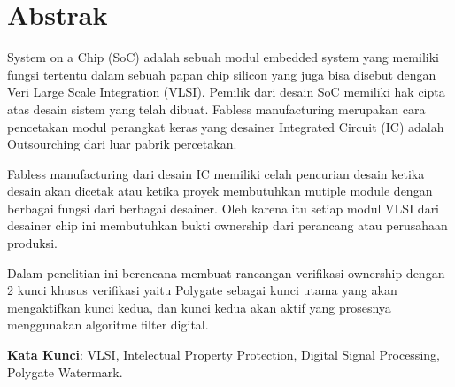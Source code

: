 \chapter*{Abstrak}

\noindent System on a Chip (SoC) adalah sebuah modul embedded system yang
memiliki fungsi tertentu dalam sebuah papan chip silicon yang juga bisa disebut
dengan Veri Large Scale Integration (VLSI). Pemilik dari desain SoC memiliki
hak cipta atas desain sistem yang telah dibuat. Fabless manufacturing merupakan
cara pencetakan modul perangkat keras yang desainer Integrated Circuit (IC)
adalah Outsourching dari luar pabrik percetakan.

\vspace*{0.5cm}
\noindent Fabless manufacturing dari desain IC memiliki celah pencurian desain
ketika desain akan dicetak atau ketika proyek membutuhkan mutiple module
dengan berbagai fungsi dari berbagai desainer. Oleh karena itu setiap modul VLSI
dari desainer chip ini membutuhkan bukti ownership dari perancang atau
perusahaan produksi.

\vspace*{0.5cm}
\noindent Dalam penelitian ini berencana membuat rancangan verifikasi ownership
dengan 2 kunci khusus verifikasi yaitu Polygate sebagai kunci utama yang akan
mengaktifkan kunci kedua, dan kunci kedua akan aktif yang prosesnya
menggunakan algoritme filter digital.

\vspace*{0.5cm}

\noindent \textbf{Kata Kunci}: VLSI, Intelectual Property Protection, Digital Signal Processing, Polygate Watermark.

\newpage